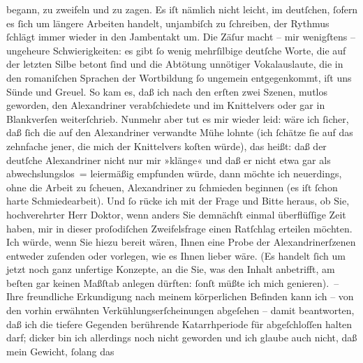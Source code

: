 \begin{ledgroupsized}[t]{13cm}
               begann, zu zweifeln und zu zagen. Es iſt nämlich nicht leicht, im deutſchen, ſofern
               es ſich um längere Arbeiten handelt, unjambiſch zu ſchreiben, der Rythmus ſchlägt
               immer wieder in den Jambentakt um. Die Zäſur macht – mir wenigſtens – ungeheure
               Schwierigkeiten: es gibt ſo wenig 
               mehrſilbige deutſche Worte, die auf der letzten Silbe betont {\pb}ſind und die Abtötung unnötiger Vokalauslaute, die in
               den romaniſchen Sprachen der Wortbildung ſo ungemein entgegenkommt, iſt uns Sünde und Greuel. So kam es, daß ich nach
               den erſten zwei Szenen, mutlos geworden, den Alexandriner verabſchiedete und im
               Knittelvers oder gar in Blankverſen weiterſchrieb. Nunmehr aber tut es mir wieder
               leid: wäre ich ſicher, daß ſich die auf den Alexandriner verwandte Mühe lohnte (ich
               ſchätze ſie auf das zehnfache jener, die mich der Knittelvers koſten würde), das
               heißt: daß der deutſche Alexandriner nicht nur mir »klänge« und daß er nicht etwa gar
               als abwechslungslos = leiermäßig empfunden würde, dann möchte ich neuerdings, ohne
               die Arbeit zu ſcheuen, Alexandriner zu ſchmieden beginnen (es iſt ſchon harte
               Schmiedearbeit).\pend
           \pstart
           Und ſo rücke ich mit der Frage und Bitte heraus, ob Sie, hochverehrter Herr Doktor,
               wenn anders Sie demnächſt einmal überflüſſige Zeit haben, mir {\pb}in dieser proſodiſchen Zweifelsfrage einen Ratſchlag
               erteilen möchten. Ich würde, wenn Sie hiezu bereit wären, Ihnen eine Probe der
               Alexandrinerſzenen entweder zuſenden oder vorlegen, wie es Ihnen lieber wäre. (Es
               handelt ſich um jetzt noch ganz unfertige Konzepte, an die Sie, was den Inhalt
               anbetrifft, am beſten gar keinen Maßſtab anlegen dürften: ſonſt müßte ich mich
               genieren). –\pend
           \pstart
           Ihre freundliche Erkundigung nach meinem körperlichen Befinden kann ich – von den
               vorhin erwähnten Verkühlungserſcheinungen abgeſehen – damit beantworten, daß ich die
               tiefere Gegenden berührende Katarrhperiode für
               abgeſchloſſen halten darf; dicker bin ich allerdings noch nicht geworden und ich
               glaube auch nicht, daß mein Gewicht, ſolang das \label{K_L02246_1v}
\end{ledgroupsized}
